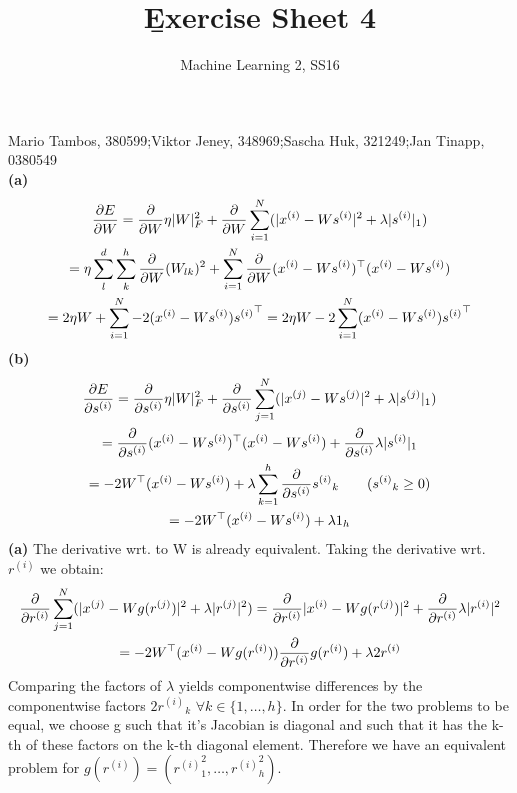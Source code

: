 \documentclass[a4paper]{article}
\newcommand{\rhi}{{r^{(i)}}}
\newcommand{\rhj}{{r^{(j)}}}
\newcommand{\xhi}{{x^{(i)}}}
\newcommand{\shi}{{s^{(i)}}}
\newcommand{\xhj}{{x^{(j)}}}
\newcommand{\shj}{{s^{(j)}}}
\newcommand{\Wlk}{W_{lk}}
\newcommand{\1}{\mathds{1}}
\begin{document}
\title{\b{Exercise Sheet 4}}
\author{Machine Learning 2, SS16}

\maketitle

Mario Tambos, 380599;\quad Viktor Jeney, 348969;\quad Sascha Huk, 321249;\quad Jan Tinapp, 0380549\\


\textbf{(a)}
\begin{gather*}
	{\partial E\over\partial W}
	=
	{\partial\over\partial W}\eta |W|_F^2
	+
	{\partial\over\partial W} \sum_{i=1}^N (|\xhi - W\shi|^2 +	\lambda |\shi|_1)
	\\
	= 
	\eta\sum_{l}^{d}\sum_{k}^{h}{\partial\over\partial W} (\Wlk)^2
	+ 
	\sum_{i=1}^N
		{\partial\over\partial W}(\xhi - W\shi)^\top (\xhi - W\shi)
	\\
	=
	2\eta W
	+ 
	\sum_{i=1}^N
		-2(\xhi - W\shi)\shi^\top
	=
	2\eta W
	- 
	2\sum_{i=1}^N
		(\xhi - W\shi)\shi^\top			
\end{gather*} 
\textbf{(b)}
\begin{gather*}
	{\partial E\over\partial \shi}
	=
	{\partial\over\partial \shi}\eta |W|_F^2
	+
	{\partial\over\partial \shi} \sum_{j=1}^N (|\xhj - W\shj|^2 +	\lambda |\shj|_1)
	\\
	=
	{\partial\over\partial \shi} (\xhi - W\shi)^\top (\xhi - W\shi) 
	              +	{\partial\over\partial \shi} \lambda |\shi|_1
	\\
	=
	-2 W^\top(\xhi-W\shi) 
	              +	\lambda \sum_{k=1}^h {\partial\over\partial \shi}\shi_k 
	              \quad\quad\text{($\shi_k\geq 0$)}
	\\
	=
	-2 W^\top(\xhi-W\shi) 
	+	\lambda 1_h	
\end{gather*} 
\textbf{(a)}
The derivative wrt. to W is already equivalent. 
Taking the derivative wrt. $\rhi$ we obtain:
\begin{gather*}
	{\partial\over\partial \rhi}\sum_{j=1}^N 
	(|\xhj - Wg(\rhj)|^2 +	\lambda |\rhj|^2)
	=
	{\partial\over\partial \rhi} |\xhi - Wg(\rhj)|^2 
	+ {\partial\over\partial \rhi} \lambda |\rhi|^2
	\\
	= -2 W^\top(\xhi-Wg(\rhi)){\partial\over\partial \rhi}g(\rhi) 
	+	\lambda 2\rhi	 
\end{gather*}
Comparing the factors of $\lambda$ yields componentwise 
differences by the componentwise factors $2\rhi_k$ $\forall k\in\{1,\ldots,h\}$. In order for 
the two problems to be equal, we choose g such that it's Jacobian is 
diagonal and such that it has the k-th of these factors on the k-th diagonal element.  
Therefore we have an equivalent problem for $g(\rhi) = (\rhi_1^2, \ldots, \rhi_h^2)$.
\end{document}
